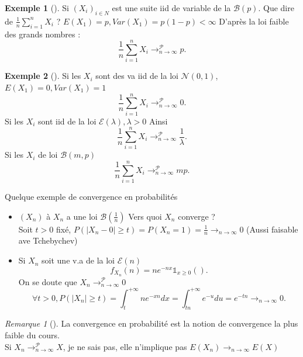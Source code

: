 \documentclass{article}
\theoremstyle{plain}%
\theoremstyle{definition}
\newtheorem{exmp}{Exemple}[section]
\theoremstyle{remark}
\newtheorem*{rem}{Remarque}
\begin{document}
\begin{exmp}[]
    Si $ (X_i)_{i \in N} $ est une suite iid de variable de la $ \mathcal{B}(p) $. Que dire de $ \frac{1}{n}\sum_{i=1}^{n}X_i $ ? $E(X_1) = p , Var(X_1)= p(1-p) < \infty$
    D'après la loi faible des grands nombres : 
    \[
        \frac{1}{n} \sum_{i=1}^{n}X_i \to_{n \to \infty }^\mathcal{P} p 
    .\]
\end{exmp}
\begin{exmp}[]
    Si les $ X_i $ sont des va iid de la loi $ \mathcal{N}(0,1) $, $ E(X_1) = 0, Var(X_1) = 1 $ 
    \[
        \frac{1}{n}\sum_{i=1}^{n}X_i \to_{n \to \infty }^\mathcal{P} 0
    .\]
    Si les $ X_i $ sont iid de la loi $ \mathcal{E}(\lambda ),\lambda >0 $ Ainsi 
    \[
        \frac{1}{n}\sum_{i=1}^{n}X_i \to_{n \to \infty }^\mathcal{P} \frac{1}{\lambda }
    .\]
    Si les $ X_i $ de loi $ \mathcal{B} (m,p) $ 
    \[
        \frac{1}{n}\sum_{i=1}^{n}X_i \to_{n \to \infty }^\mathcal{P} mp
    .\]
\end{exmp}
Quelque exemple de convergence en probabilités \begin{itemize}
    \item $ (X_n) $ à $ X_n $ a une loi $\mathcal{B}(\frac{1}{n})$ Vers quoi $ X_n $ converge ? \\ 
    Soit $ t>0 $ fixé, $ P(\left| X_n-0 \right| \geq t) = P(X_n=1) = \frac{1}{n} \to _{n \to \infty } 0 $ (Aussi faisable ave Tchebychev) 
    \item Si $ X_n $ soit une v.a de la loi $ \mathcal{E}(n) $ 
    \[
        f_{X_n}(n) = ne^{-nx} \mathbb{1}_{x \geq 0}()
    .\]
    On se doute que $ X_n \to_{n \to \infty }^\mathcal{P} 0 $ 
    \[
        \forall t > 0, P(\left| X_n \right| \geq t) = \int_{t}^{+\infty }ne^{-xn} dx = \int_{tn}^{+\infty } e^{-u} du = e^{-tn} \to_{n \to \infty } 0
    .\]    
\end{itemize}

\begin{rem}[]
    La convergence en probabilité est la notion de convergence la plus faible du cours. \\ 
    Si $ X_n \to_{n \to \infty }^\mathcal{P} X $, je ne sais pas, elle n'implique pas $ E(X_n) \to_{n \to \infty } E(X) $  
\end{rem}
\end{document}
